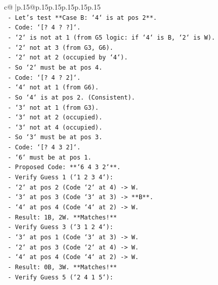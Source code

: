 \documentclass{article}
\begin{document}
{\begin{supertabular}{c@{$\;$}|p{.15\linewidth}@{}p{.15\linewidth}p{.15\linewidth}p{.15\linewidth}p{.15\linewidth}p{.15\linewidth}}
{{{\\ 
\texttt{    {-} Let's test **Case B: `4` is at pos 2**.} \\
\texttt{        {-} Code: `{[}? 4 ? ?{]}`.} \\
\texttt{        {-} `2` is not at 1 (from G5 logic: if `4` is B, `2` is W).} \\
\texttt{        {-} `2` not at 3 (from G3, G6).} \\
\texttt{        {-} `2` not at 2 (occupied by `4`).} \\
\texttt{        {-} So `2` must be at pos 4.} \\
\texttt{        {-} Code: `{[}? 4 ? 2{]}`.} \\
\texttt{        {-} `4` not at 1 (from G6).} \\
\texttt{        {-} So `4` is at pos 2. (Consistent).} \\
\texttt{        {-} `3` not at 1 (from G3).} \\
\texttt{        {-} `3` not at 2 (occupied).} \\
\texttt{        {-} `3` not at 4 (occupied).} \\
\texttt{        {-} So `3` must be at pos 3.} \\
\texttt{        {-} Code: `{[}? 4 3 2{]}`.} \\
\texttt{        {-} `6` must be at pos 1.} \\
\texttt{        {-} Proposed Code: **`6 4 3 2`**.} \\
\texttt{        {-} Verify Guess 1 (`1 2 3 4`):} \\
\texttt{            {-} `2` at pos 2 (Code `2` at 4) {-}> W.} \\
\texttt{            {-} `3` at pos 3 (Code `3` at 3) {-}> **B**.} \\
\texttt{            {-} `4` at pos 4 (Code `4` at 2) {-}> W.} \\
\texttt{            {-} Result: 1B, 2W. **Matches!**} \\
\texttt{        {-} Verify Guess 3 (`3 1 2 4`):} \\
\texttt{            {-} `3` at pos 1 (Code `3` at 3) {-}> W.} \\
\texttt{            {-} `2` at pos 3 (Code `2` at 4) {-}> W.} \\
\texttt{            {-} `4` at pos 4 (Code `4` at 2) {-}> W.} \\
\texttt{            {-} Result: 0B, 3W. **Matches!**} \\
\texttt{        {-} Verify Guess 5 (`2 4 1 5`):} \\
}}}
\end{supertabular}}
\end{document}
